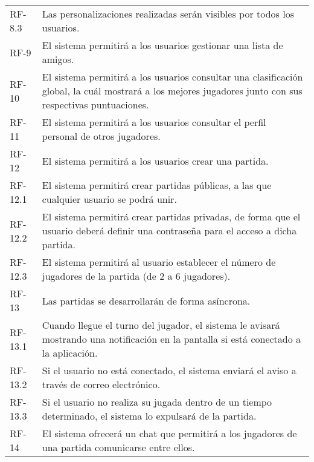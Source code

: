 \documentclass[12pt, a4paper, titlepage]{article}
\begin{document}
\begin{longtable}
\begin{tabularx}{\textwidth}{|l|X|}
         RF-8.3 & Las personalizaciones realizadas serán visibles por todos los usuarios.\\
         RF-9 & El sistema permitirá a los usuarios gestionar una lista de amigos.\\
         RF-10 & El sistema permitirá a los usuarios consultar una clasificación global, la cuál mostrará a los mejores jugadores junto con sus respectivas puntuaciones.\\
         RF-11 & El sistema permitirá a los usuarios consultar el perfil personal de otros jugadores.\\
         RF-12 & El sistema permitirá a los usuarios crear una partida.\\
         RF-12.1 & El sistema permitirá crear partidas públicas, a las que cualquier usuario se podrá unir.\\
         RF-12.2 & El sistema permitirá crear partidas privadas, de forma que el usuario deberá definir una contraseña para el acceso a dicha partida.\\
         RF-12.3 & El sistema permitirá al usuario establecer el número de jugadores de la partida (de 2 a 6 jugadores).\\
         RF-13 & Las partidas se desarrollarán de forma asíncrona.\\
         RF-13.1 & Cuando llegue el turno del jugador, el sistema le avisará mostrando una notificación en la pantalla si está conectado a la aplicación.\\
         RF-13.2 & Si el usuario no está conectado, el sistema enviará el aviso a través de correo electrónico.\\
         RF-13.3 & Si el usuario no realiza su jugada dentro de un tiempo determinado, el sistema lo expulsará de la partida.\\
         RF-14 & El sistema ofrecerá un chat que permitirá a los jugadores de una partida comunicarse entre ellos.\\
         \hline
    \end{tabularx}
    \caption{Requisitos funcionales de la aplicación}
    \label{tab:rf}
\end{longtable}
\end{document}
